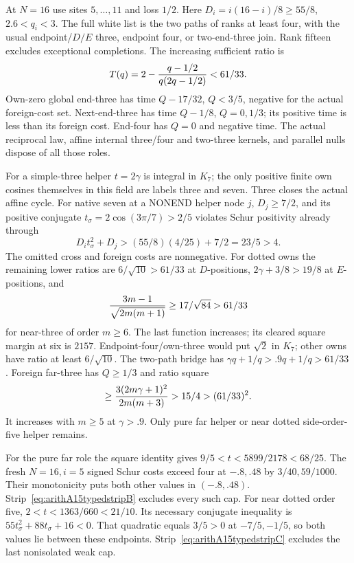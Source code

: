 \documentclass[11pt]{article}
\begin{document}
At \(N=16\) use sites \(5,\ldots,11\)
and loss \(1/2\).
Here \(D_i=i(16-i)/8\ge55/8\), \(2.6<q_i<3\).
The full white list is the two paths
of ranks at least four, with the usual
endpoint/\(D/E\) three, endpoint four,
or two-end-three join.
Rank fifteen excludes exceptional completions.
The increasing sufficient ratio is
\[
             T(q)=2-{q-1/2\over q(2q-1/2)}<61/33 .
\]
Own-zero global end-three has time
\(Q-17/32\), \(Q<3/5\), negative for
the actual foreign-cost set.
Next-end-three has time \(Q-1/8\),
\(Q=0,1/3\); its positive time is
less than its foreign cost.
End-four has \(Q=0\) and negative time.
The actual reciprocal law, affine internal
three/four and two-three kernels, and
parallel nulls dispose of all those roles.

For a simple-three helper \(t=2\gamma\)
is integral in \(K_7\); the only positive
finite own cosines themselves in this
field are labels three and seven.
Three closes the actual affine cycle.
For native seven at a NONEND helper node
\(j\), \(D_j\ge7/2\), and its positive
conjugate \(t_\sigma=2\cos(3\pi/7)>2/5\)
violates Schur positivity already through
\[
                 D_it_\sigma^2+D_j>
                       (55/8)(4/25)+7/2=23/5>4 .
\]
The omitted cross and foreign costs are
nonnegative.
For dotted owns the remaining lower
ratios are \(6/\sqrt{10}>61/33\) at
\(D\)-positions, \(2\gamma+3/8>19/8\)
at \(E\)-positions, and
\[
 {3m-1\over\sqrt{2m(m+1)}}\ge17/\sqrt{84}>61/33
\]
for near-three of order \(m\ge6\).
The last function increases; its cleared
square margin at six is \(2157\).
Endpoint-four/own-three would put
\(\sqrt2\) in \(K_7\); other owns have
ratio at least \(6/\sqrt{10}\).
The two-path bridge has
\(\gamma q+1/q>.9q+1/q>61/33\).
Foreign far-three has \(Q\ge1/3\)
and ratio square
\[
          \ge{3(2m\gamma+1)^2\over2m(m+3)}
                         >15/4>(61/33)^2 .
\]
It increases with \(m\ge5\) at \(\gamma>.9\).
Only pure far helper or near dotted
side-order-five helper remains.

For the pure far role the square identity
gives \(9/5<t<5899/2178<68/25\).
The fresh \(N=16,i=5\) signed Schur
costs exceed four at \(-.8,.48\)
by \(3/40,59/1000\).
Their monotonicity puts both other values
in \((-.8,.48)\).
Strip~\eqref{eq:arithA15typedstripB}
excludes every such cap.
For near dotted order five,
\(2<t<1363/660<21/10\).
Its necessary conjugate inequality is
\(55t_\sigma^2+88t_\sigma+16<0\).
That quadratic equals \(3/5>0\) at
\(-7/5,-1/5\), so both values lie
between these endpoints.
Strip~\eqref{eq:arithA15typedstripC}
excludes the last nonisolated weak cap.
\end{document}
